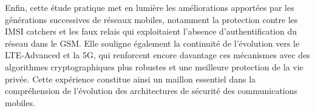 \documentclass[12pt,a4paper]{report}
\begin{document}
Enfin, cette étude pratique met en lumière les améliorations apportées par les générations successives de réseaux mobiles, notamment la protection contre les IMSI catchers et les faux relais qui exploitaient l'absence d'authentification du réseau dans le GSM. Elle souligne également la continuité de l'évolution vers le LTE-Advanced et la 5G, qui renforcent encore davantage ces mécanismes avec des algorithmes cryptographiques plus robustes et une meilleure protection de la vie privée. Cette expérience constitue ainsi un maillon essentiel dans la compréhension de l'évolution des architectures de sécurité des communications mobiles.
\end{document}
